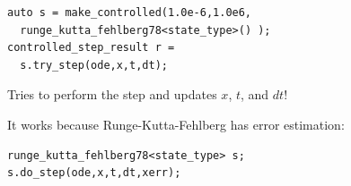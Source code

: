 \begin{frame}
 



 
\end{frame}



\begin{frame}[fragile]
 
 
 \vspace{2ex}

 \begin{lstlisting}
auto s = make_controlled(1.0e-6,1.0e6,
  runge_kutta_fehlberg78<state_type>() );
controlled_step_result r = 
  s.try_step(ode,x,t,dt);
 \end{lstlisting}

 Tries to perform the step and updates $x$, $t$, and $dt$!

 \vspace{4ex}

 It works because Runge-Kutta-Fehlberg has error estimation:

 \begin{lstlisting}
runge_kutta_fehlberg78<state_type> s;
s.do_step(ode,x,t,dt,xerr);
 \end{lstlisting}


\end{frame}


